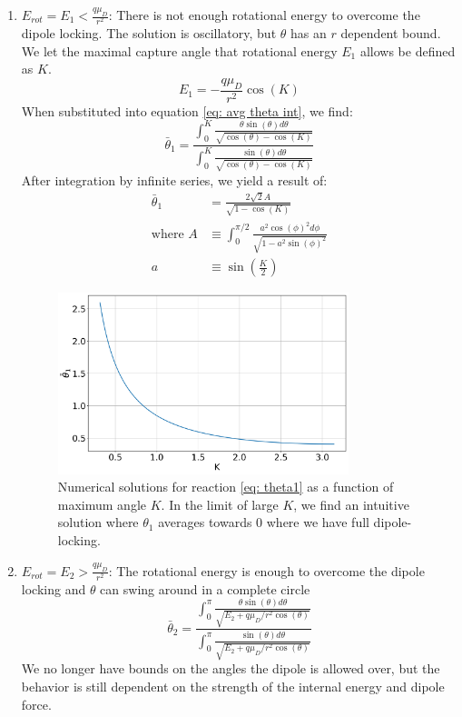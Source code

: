 \begin{enumerate}
	\item $E_{rot} = E_1 < \frac{q \mu_D}{r^2}$:
	There is not enough rotational energy to overcome the dipole locking. The solution is oscillatory, but $\theta$ has an $r$ dependent bound. We let the maximal capture angle that rotational energy $E_1$ allows be defined as $K$.
	\begin{equation*}
		E_1=-\frac{q \mu_D}{r^2}\cos(K)
	\end{equation*}
	When substituted into equation \ref{eq: avg theta int}, we find:
	\begin{equation}
	    \bar{\theta}_1 = \dfrac{\displaystyle\int_0^K \frac{\theta \sin(\theta) d \theta}{\sqrt{\cos(\theta) - \cos(K)}}}{\displaystyle\int_0^K \frac{\sin(\theta) d \theta}{\sqrt{\cos(\theta) - \cos(K)}}} \label{eq: theta1}
	\end{equation}
	After integration by infinite series, we yield a result of:
	\begin{align*}
	    \bar{\theta}_1 & = \frac{2 \sqrt{2}A}{\sqrt{1-\cos(K)}} \\
	    \text{where }A & \equiv \int_0^{\pi/2} \frac{a^2 \cos(\phi)^2 d\phi}{\sqrt{1-a^2 \sin(\phi)^2}} \\
	    a & \equiv \sin\left(\frac{K}{2}\right)
	\end{align*}

	\begin{figure}[H]
		\label{fig: theta1}
		\centering
		\includegraphics[width=0.8\textwidth]{images/ADO_theta1.png}
		\caption{Numerical solutions for reaction \ref{eq: theta1} as a function of maximum angle $K$. In the limit of large $K$, we find an intuitive solution where $\theta_1$ averages towards 0 where we have full dipole-locking.}
	\end{figure}

	\item $E_{rot} = E_2 > \frac{q \mu_D}{r^2}$:
	The rotational energy is enough to overcome the dipole locking and $\theta$ can swing around in a complete circle
	\begin{equation}
	    \bar{\theta}_2  = \dfrac{\displaystyle\int_0^\pi \frac{\theta \sin(\theta) d\theta}{\sqrt{E_2 + q \mu_D/r^2 \cos(\theta)}}}{\displaystyle\int_0^\pi \frac{\sin(\theta) d \theta}{\sqrt{E_2 + q \mu_D/r^2 \cos(\theta)}}} \label{eq: theta2}
	\end{equation}
	We no longer have bounds on the angles the dipole is allowed over, but the behavior is still dependent on the strength of the internal energy and dipole force.


\end{enumerate}
